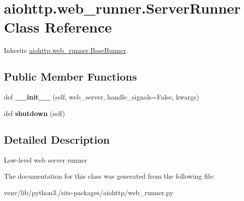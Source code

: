 \hypertarget{classaiohttp_1_1web__runner_1_1_server_runner}{}\section{aiohttp.\+web\+\_\+runner.\+Server\+Runner Class Reference}
\label{classaiohttp_1_1web__runner_1_1_server_runner}


Inherits \hyperlink{classaiohttp_1_1web__runner_1_1_base_runner}{aiohttp.\+web\+\_\+runner.\+Base\+Runner}.

\subsection*{Public Member Functions}
\begin{DoxyCompactItemize}
\item 
\mbox{\label{classaiohttp_1_1web__runner_1_1_server_runner_ac21c8060dffd7657e336ec6e75b15a16}} 
def {\bfseries \+\_\+\+\_\+init\+\_\+\+\_\+} (self, web\+\_\+server, handle\+\_\+signals=False, kwargs)
\item 
\mbox{\label{classaiohttp_1_1web__runner_1_1_server_runner_a2202b71daf648c74fbdf846fa281dbb1}} 
def {\bfseries shutdown} (self)
\end{DoxyCompactItemize}


\subsection{Detailed Description}
\begin{DoxyVerb}Low-level web server runner\end{DoxyVerb}
 

The documentation for this class was generated from the following file\+:\begin{DoxyCompactItemize}
\item 
venv/lib/python3./site-\/packages/aiohttp/web\+\_\+runner.\+py\end{DoxyCompactItemize}
